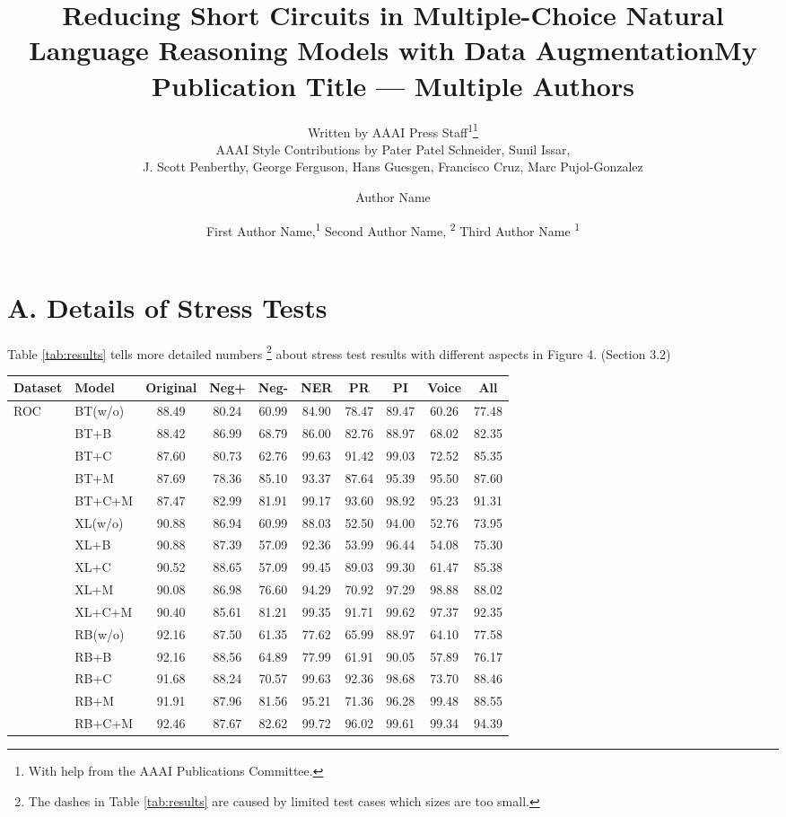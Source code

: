 \documentclass[letterpaper]{article} %
\title{Reducing Short Circuits in Multiple-Choice Natural Language Reasoning Models with Data Augmentation}
\author{
    Written by AAAI Press Staff\textsuperscript{\rm 1}\thanks{With help from the AAAI Publications Committee.}\\
    AAAI Style Contributions by Pater Patel Schneider,
    Sunil Issar,\\
    J. Scott Penberthy,
    George Ferguson,
    Hans Guesgen,
    Francisco Cruz\equalcontrib,
    Marc Pujol-Gonzalez\equalcontrib
}
\author {
    Author Name
}
\title{My Publication Title --- Multiple Authors}
\author {
    First Author Name,\textsuperscript{\rm 1}
    Second Author Name, \textsuperscript{\rm 2}
    Third Author Name \textsuperscript{\rm 1}
}
\newcommand{\secref}[1]{Section \ref{#1}}
\newcommand{\tabref}[1]{Table \ref{#1}}
\newcommand{\KZ}[1]{\textcolor{blue}{Kenny: #1}}
\begin{document}
\section{A.  Details of Stress Tests}
\tabref{tab:results} tells more detailed numbers
\footnote{The dashes in \tabref{tab:results} are caused by limited test cases 
which sizes are too small.} 
about 
stress test results with different aspects in Figure 4. (Section 3.2)

\begin{table}[th]
\scriptsize
\centering
\begin{tabular}{ll|c|ccccccc}\hline
\toprule  
\textbf{Dataset}&\textbf{Model}&\textbf{Original} &\textbf{Neg+} & \textbf{Neg-} &\textbf{NER} &\textbf{PR} &\textbf{PI}&\textbf{Voice}&\textbf{All}
                                               \\ 
 \hline
 \multirow{15}{*}{ROC} 
&BT(w/o)&88.49 &80.24 &60.99 &84.90 &78.47 &89.47 &60.26 &77.48 \\ 
&BT+B&88.42 &86.99 &68.79 &86.00 &82.76 &88.97 &68.02 &82.35 \\ 
&BT+C&87.60 &80.73 &62.76 &99.63 &91.42 &99.03 &72.52 &85.35 \\ 
&BT+M&87.69 &78.36 &85.10 &93.37 &87.64 &95.39 &95.50 &87.60 \\ 
&BT+C+M&87.47 &82.99 &81.91 &99.17 &93.60 &98.92 &95.23 &91.31 \\ 
\cline{2-10}
&XL(w/o)&90.88 &86.94 &60.99 &88.03 &52.50 &94.00 &52.76 &73.95 \\ 
&XL+B&90.88 &87.39 &57.09 &92.36 &53.99 &96.44 &54.08 &75.30 \\ 
&XL+C&90.52 &88.65 &57.09 &99.45 &89.03 &99.30 &61.47 &85.38 \\ 
&XL+M&90.08 &86.98 &76.60 &94.29 &70.92 &97.29 &98.88 &88.02 \\ 
&XL+C+M&90.40 &85.61 &81.21 &99.35 &91.71 &99.62 &97.37 &92.35 \\ 
\cline{2-10}
&RB(w/o)&92.16 &87.50 &61.35 &77.62 &65.99 &88.97 &64.10 &77.58 \\ 
&RB+B&92.16 &88.56 &64.89 &77.99 &61.91 &90.05 &57.89 &76.17 \\ 
&RB+C&91.68 &88.24 &70.57 &99.63 &92.36 &98.68 &73.70 &88.46 \\ 
&RB+M&91.91 &87.96 &81.56 &95.21 &71.36 &96.28 &99.48 &88.55 \\ 
&RB+C+M&92.46 &87.67 &82.62 &99.72 &96.02 &99.61 &99.34 &94.39 \\ 
\hline

\end{tabular}
\end{table}
\end{document}
